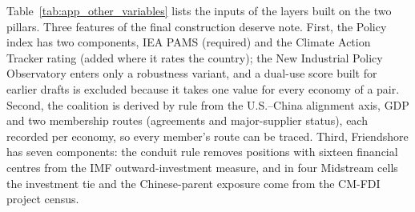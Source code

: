 Table~\ref{tab:app_other_variables} lists the inputs of the layers built on the two pillars. Three
features of the final construction deserve note. First, the Policy index has two components, IEA
PAMS (required) and the Climate Action Tracker rating (added where it rates the country); the New
Industrial Policy Observatory enters only a robustness variant, and a dual-use score built for
earlier drafts is excluded because it takes one value for every economy of a pair. Second, the
coalition is derived by rule from the U.S.--China alignment axis, GDP and two membership routes
(agreements and major-supplier status), each recorded per economy, so every member's route can be
traced. Third, Friendshore has seven components: the conduit rule removes positions with sixteen
financial centres from the IMF outward-investment measure, and in four Midstream cells the
investment tie and the Chinese-parent exposure come from the CM-FDI project census.

